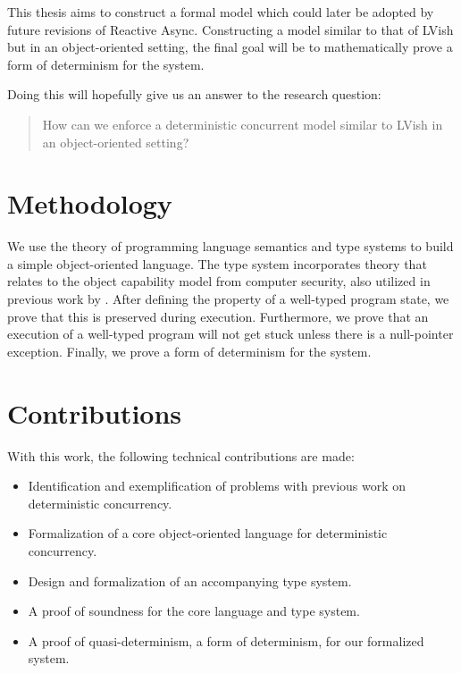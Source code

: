 This thesis aims to construct a formal model which could later be adopted by
future revisions of Reactive Async. Constructing a model similar to that
of LVish but in an object-oriented setting, the final goal
will be to mathematically prove a form of determinism for the system.

Doing this will hopefully give us an answer to the research question:

\begin{quotation}
  How can we enforce a deterministic concurrent model similar to LVish in an
  object-oriented setting?
\end{quotation}

\section{Methodology}%
\label{sec:methodology}

We use the theory of programming language semantics and type systems to build a
simple object-oriented language. The type system incorporates theory that
relates to the object capability model from computer security, also utilized in
previous work by \textcite{conf/oopsla/HallerL16}.  After defining the property
of a well-typed program state, we prove that this is preserved during execution.
Furthermore, we prove that an execution of a well-typed program will not get
stuck unless there is a null-pointer exception. Finally, we prove a form of
determinism for the system.

\section{Contributions}%
\label{sec:contributions}

With this work, the following technical contributions are made:
\begin{itemize}
  \item Identification and exemplification of  problems with previous work on
    deterministic concurrency.
  \item Formalization of a core object-oriented language for deterministic
    concurrency.
  \item Design and formalization of an accompanying type system.
  \item A proof of soundness for the core language and type system.
  \item A proof of quasi-determinism, a form of determinism, for our
    formalized system.
\end{itemize}

